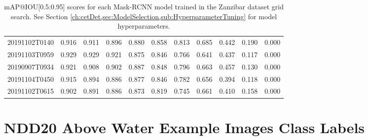 \begin{table}[!ht]
{\begin{tabular}{ccccccccccc}
			20191102T0140 &          0.916 &          0.911 &          0.896 &          0.880 &          0.858 &          0.813 &          0.685 &          0.442 &          0.190 &          0.000 \\
			20191103T0959 &          0.929 &          0.929 &          0.921 &          0.875 &          0.846 &          0.766 &          0.641 &          0.437 &          0.117 &          0.000 \\
			20190907T0934 &          0.921 &          0.908 &          0.902 &          0.887 &          0.848 &          0.796 &          0.663 &          0.457 &          0.130 &          0.000 \\
			20191104T0450 &          0.915 &          0.894 &          0.886 &          0.877 &          0.846 &          0.782 &          0.656 &          0.394 &          0.118 &          0.000 \\
			20191102T0615 &          0.902 &          0.891 &          0.886 &          0.873 &          0.819 &          0.745 &          0.661 &          0.410 &          0.158 &          0.000 \\
			\bottomrule
		\end{tabular}}
	\caption{mAP@IOU[0.5:0.95] scores for each Mask-RCNN model trained in the Zanzibar dataset grid search. See Section \ref{ch:cetDet,sec:ModelSelection,sub:HyperparameterTuning} for model hyperparameters.}
\end{table}

\newpage
\section{NDD20 Above Water Example Images Class Labels}\label{app:NDD20AwegLabels}

